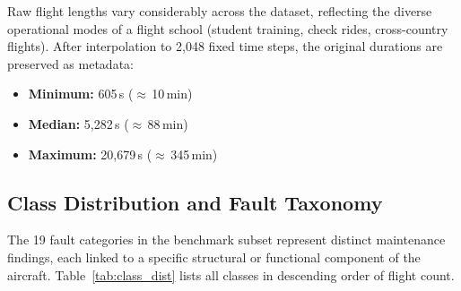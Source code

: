 Raw flight lengths vary considerably across the dataset, reflecting the diverse
operational modes of a flight school (student training, check rides, cross-country
flights). After interpolation to 2{,}048 fixed time steps, the original durations
are preserved as metadata:

\begin{itemize}
    \item \textbf{Minimum:} 605\,s ($\approx$\,10\,min)
    \item \textbf{Median:} 5{,}282\,s ($\approx$\,88\,min)
    \item \textbf{Maximum:} 20{,}679\,s ($\approx$\,345\,min)
\end{itemize}

\subsection{Class Distribution and Fault Taxonomy}

The 19 fault categories in the benchmark subset represent distinct maintenance
findings, each linked to a specific structural or functional component of the
aircraft. Table~\ref{tab:class_dist} lists all classes in descending order of
flight count.

